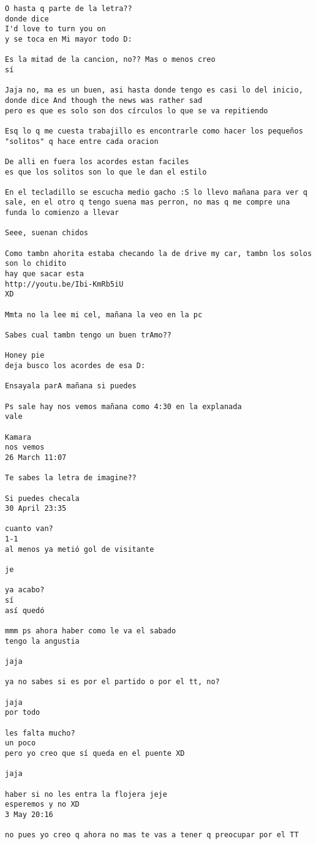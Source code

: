 \begin{verbatim}
O hasta q parte de la letra??
donde dice
I'd love to turn you on
y se toca en Mi mayor todo D:

Es la mitad de la cancion, no?? Mas o menos creo
sí

Jaja no, ma es un buen, asi hasta donde tengo es casi lo del inicio, donde dice And though the news was rather sad
pero es que es solo son dos círculos lo que se va repitiendo

Esq lo q me cuesta trabajillo es encontrarle como hacer los pequeños "solitos" q hace entre cada oracion

De alli en fuera los acordes estan faciles
es que los solitos son lo que le dan el estilo

En el tecladillo se escucha medio gacho :S lo llevo mañana para ver q sale, en el otro q tengo suena mas perron, no mas q me compre una funda lo comienzo a llevar

Seee, suenan chidos

Como tambn ahorita estaba checando la de drive my car, tambn los solos son lo chidito
hay que sacar esta
http://youtu.be/Ibi-KmRb5iU
XD

Mmta no la lee mi cel, mañana la veo en la pc

Sabes cual tambn tengo un buen trAmo??

Honey pie
deja busco los acordes de esa D:

Ensayala parA mañana si puedes

Ps sale hay nos vemos mañana como 4:30 en la explanada 
vale

Kamara
nos vemos
26 March 11:07

Te sabes la letra de imagine??

Si puedes checala
30 April 23:35

cuanto van?
1-1
al menos ya metió gol de visitante

je

ya acabo?
sí
así quedó

mmm ps ahora haber como le va el sabado
tengo la angustia 

jaja

ya no sabes si es por el partido o por el tt, no?

jaja
por todo

les falta mucho?
un poco
pero yo creo que sí queda en el puente XD

jaja

haber si no les entra la flojera jeje
esperemos y no XD
3 May 20:16

no pues yo creo q ahora no mas te vas a tener q preocupar por el TT


\end{verbatim}
